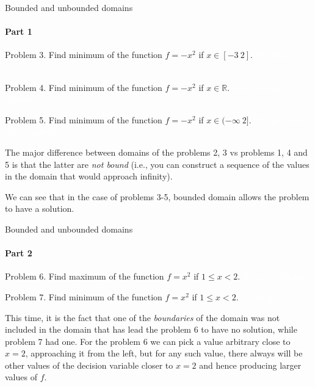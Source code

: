 \documentclass{beamer}
\begin{document}
\begin{frame}{Bounded and unbounded domains}
	\framesubtitle{Part 1}
	\begin{flushleft}
		
		Problem 3. Find minimum of the function $f = -x^2$ if $x \in [-3 \ 2]$. \textcolor{white}{Solution is $x = -3$.}
		
		\bigskip
		
		Problem 4. Find minimum of the function $f = -x^2$ if $x \in \mathbb{R}$. \textcolor{white}{The problem has no solution.}
		
		\bigskip
		
		Problem 5. Find minimum of the function $f = -x^2$ if $x \in  (-\infty \ 2]$. \textcolor{white}{The problem has no solution.}
		
		\bigskip
		
		The major difference between domains of the problems 2, 3 vs problems 1, 4 and 5 is that the latter are \emph{not bound} (i.e., you can construct a sequence of the values in the domain that would approach infinity).
		
		\bigskip
		
		We can see that in the case of problems 3-5, bounded domain allows the problem to have a solution.
		
	\end{flushleft}
\end{frame}



\begin{frame}{Bounded and unbounded domains}
	\framesubtitle{Part 2}
	\begin{flushleft}
		
		Problem 6. Find maximum of the function $f = x^2$ if $1 \leq x < 2$. \textcolor{white}{It has no solution.}
		
		\bigskip
		
		Problem 7. Find minimum of the function $f = x^2$ if $1 \leq x < 2$. \textcolor{white}{Solution is $x = 1$.}
		
		\bigskip
		
		This time, it is the fact that one of the \emph{boundaries} of the domain was not included in the domain that has lead the problem 6 to have no solution, while problem 7 had one. For the problem 6 we can pick a value arbitrary close to $x = 2$, approaching it from the left, but for any such value, there always will be other values of the decision variable closer to $x = 2$ and hence producing larger values of $f$.
		
	\end{flushleft}
\end{frame}
\end{document}
